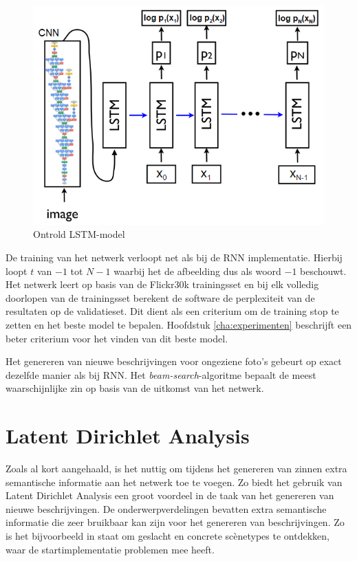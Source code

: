 \begin{figure}[tb]
	\centering
	\includegraphics[width=1\linewidth]{Images/vinyals_karpathy.PNG}
	\caption[Ontrold LSTM-model]{Ontrold LSTM-model~\cite{Google}}
	\label{fig:vinyals:karpathy}
\end{figure}

De training van het netwerk verloopt net als bij de RNN implementatie. Hierbij loopt $t$ van $-1$ tot $N-1$ waarbij het de afbeelding dus als woord $-1$ beschouwt. Het netwerk leert op basis van de Flickr30k trainingsset en bij elk volledig doorlopen van de trainingsset berekent de software de perplexiteit van de resultaten op de validatieset. Dit dient als een criterium om de training stop te zetten en het beste model te bepalen. Hoofdstuk \ref{cha:experimenten} beschrijft een beter criterium voor het vinden van dit beste model.


Het genereren van nieuwe beschrijvingen voor ongeziene foto's gebeurt op exact dezelfde manier als bij RNN. Het \emph{beam-search}-algoritme bepaalt de meest waarschijnlijke zin op basis van de uitkomst van het netwerk.


\section{Latent Dirichlet Analysis}
\label{sec:LDAglobal}
Zoals al kort aangehaald, is het nuttig om tijdens het genereren van zinnen extra semantische informatie aan het netwerk toe te voegen.
Zo biedt het gebruik van Latent Dirichlet Analysis een groot voordeel in de taak van het genereren van nieuwe beschrijvingen. De onderwerpverdelingen bevatten extra semantische informatie die zeer bruikbaar kan zijn voor het genereren van beschrijvingen. Zo is het bijvoorbeeld in staat om geslacht en concrete sc\`enetypes te ontdekken, waar de startimplementatie problemen mee heeft.

